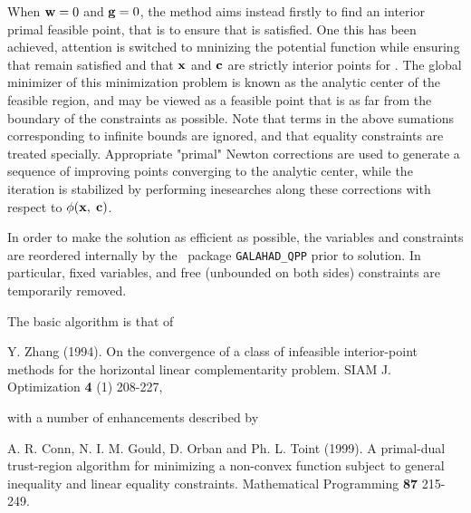 \documentclass{galahad}
\begin{document}
When ${\mathbf{w}} = 0$ and ${\mathbf{g}} = 0$, the method aims instead firstly to find an 
interior primal feasible point, that is to ensure that  is satisfied. 
One this has been achieved, attention is switched to mninizing the
potential function
while ensuring that  remain satisfied and that 
${\mathbf{x}}$ and ${\mathbf{c}}$ are strictly interior points for . 
The global minimizer of this minimization problem is known as the
analytic center of the feasible region, and may be viewed as
a feasible point that is as far from the boundary of the constraints as 
possible.
Note that terms in the above sumations corresponding to infinite bounds are
ignored, and that equality constraints are treated specially.
Appropriate "primal" Newton corrections are used to generate a sequence
of improving points converging to the analytic center, while the iteration
is stabilized by performing inesearches along these corrections with respect to
$\phi ({\mathbf{x}},\;{\mathbf{c}})$.

In order to make the solution as efficient as possible, the 
variables and constraints are reordered internally
by the \galahad\ package {\tt GALAHAD\_QPP} prior to solution. 
In particular, fixed variables, and 
free (unbounded on both sides) constraints are temporarily removed.
\vspace*{1mm}

\galreferences
\vspace*{1mm}

\noindent
The basic algorithm is that of
\vspace*{1mm}

\noindent
Y. Zhang (1994).
On the convergence of a class of infeasible interior-point methods for the
horizontal linear complementarity problem.
SIAM J. Optimization {\bf 4} (1) 208-227,
\vspace*{1mm}

\noindent
with a number of enhancements described by
\vspace*{1mm}

\noindent
A. R. Conn, N. I. M. Gould, D. Orban and Ph. L. Toint (1999).
A primal-dual trust-region algorithm for minimizing a non-convex 
function subject to general inequality and linear equality constraints.
Mathematical Programming {\bf 87} 215-249.

\end{document}
